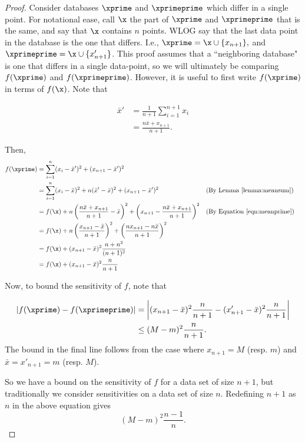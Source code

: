 \documentclass[11pt]{scrartcl} %
\begin{document}
\begin{proof}
Consider databases $\xprime$ and $\xprimeprime$ which differ in a single point. For notational ease, call $\x$ the part of $\xprime$ and $\xprimeprime$
that is the same, and say that $\x$ contains $n$ points. WLOG say that the last data point in the database is the one that differs. I.e.,
$\xprime = \x \cup \{x_{n+1}\},$ and $\xprimeprime = \x \cup \{x'_{n+1}\}$. This proof assumes that a ``neighboring database" is one that differs in a single
data-point, so we will ultimately be comparing $f(\xprime)$ and $f(\xprimeprime)$. However, it is useful to first write $f(\xprime)$ in terms of $f(\x)$.
Note that

\begin{align}
\label{eqn:meanprime}
\bar{x}' &= \frac{1}{n+1} \sum_{i=1}^{n+1} x_i \nonumber \\
	&= \frac{n\bar{x} + x_{n+1}}{n+1}.
\end{align}

Then,
\begin{align*}
f(\xprime) &= \sum_{i=1}^n (x_i - \bar{x}')^2 + (x_{n+1} - \bar{x}')^2\\
	&= \sum_{i=1}^n (x_i - \bar{x})^2 + n(\bar{x}'-\bar{x})^2 + (x_{n+1} - \bar{x}')^2 &&\text{(By Lemma \ref{lemma:meansum})}\\
	&= f(\x) + n\left( \frac{n\bar{x} + x_{n+1}}{n+1}-\bar{x}\right)^2 + \left(x_{n+1} - \frac{n\bar{x} + x_{n+1}}{n+1} \right)^2 &&\text{(By Equation \ref{eqn:meanprime})}\\
	&= f(\x) + n\left(\frac{x_{n+1}-\bar{x}}{n+1}\right)^2 + \left( \frac{nx_{n+1}-n\bar{x}}{n+1}\right)^2\\
	&= f(\x) + (x_{n+1}-\bar{x})^2 \frac{n+n^2}{(n+1)^2}\\
	&= f(\x) + (x_{n+1}-\bar{x})^2 \frac{n}{n+1}\\
\end{align*}

Now, to bound the sensitivity of $f$, note that

\begin{align}
	\label{eq:l1_np1_bound}
\left\vert f(\xprime) - f(\xprimeprime) \right\vert &= \left\vert (x_{n+1}-\bar{x})^2 \frac{n}{n+1} - (x_{n+1}'-\bar{x})^2 \frac{n}{n+1} \right\vert \\
	&\le (M-m)^2 \frac{n}{n+1}. \nonumber
\end{align}
The bound in the final line follows from the case where $x_{n+1} = M$ (resp. $m$) and $\bar{x} = x'_{n+1} = m$ (resp. $M$). \newline

So we have a bound on the sensitivity of $f$ for a data set of size $n+1$, but traditionally we consider sensitivities
on a data set of size $n$.
Redefining $n+1$ as $n$ in the above equation gives
$$ (M-m)^2 \frac{n-1}{n}. $$
\end{proof}
\end{document}
